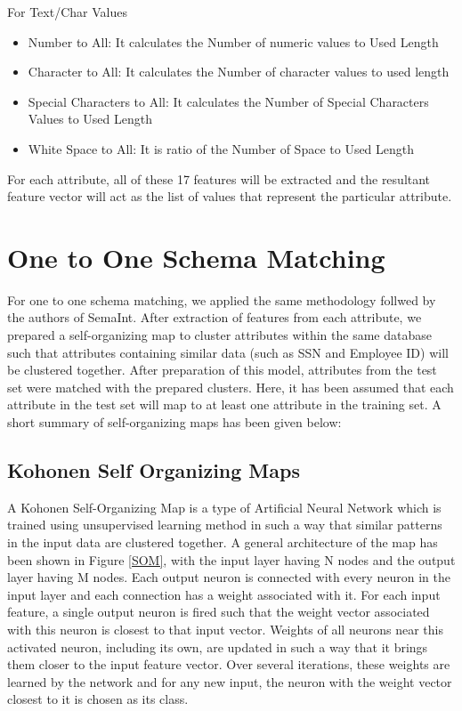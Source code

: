 \documentclass[conference]{IEEEtran}
\begin{document}
For Text/Char Values
\begin{itemize}
\item Number to All: It calculates the Number of numeric values to Used Length
\item Character to All: It calculates the Number of character values to used length
\item Special Characters to All: It calculates the Number of Special Characters Values to Used Length
\item White Space to All: It is ratio of the Number of Space to Used  Length
\end{itemize}

For each attribute, all of these 17 features will be extracted and the resultant feature vector will act as the list of values that represent the particular attribute.

\section{One to One Schema Matching}
For one to one schema matching, we applied the same methodology follwed by the authors of SemaInt. After extraction of features from each attribute, we prepared a self-organizing map to cluster attributes within the same database such that attributes containing similar data (such as SSN and Employee ID) will be clustered together. After preparation of this model, attributes from the test set were matched with the prepared clusters. Here, it has been assumed that each attribute in the test set will map to at least one attribute in the training set. A short summary of self-organizing maps has been given below:

\subsection{Kohonen Self Organizing Maps \cite{SOM}}
A Kohonen Self-Organizing Map is a type of Artificial Neural Network which is trained using unsupervised learning method in such a way that similar patterns in the input data are clustered together. A general architecture of the map has been shown in Figure \ref{SOM}, with the input layer having N nodes and the output layer having M nodes. Each output neuron is connected with every neuron in the input layer and each connection has a weight associated with it. 
For each input feature, a single output neuron is fired such that the weight vector associated with this neuron is closest to that input vector. Weights of all neurons near this activated neuron, including its own, are updated in such a way that it brings them closer to the input feature vector. Over several iterations, these weights are learned by the network and for any new input, the neuron with the weight vector closest to it is chosen as its class.
\end{document}
